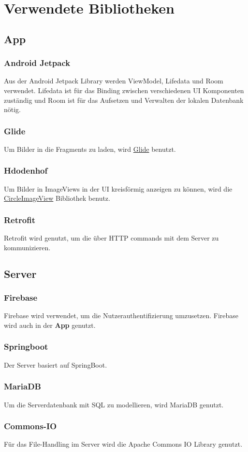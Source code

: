 \chapter{Verwendete Bibliotheken}

\section{App}

\subsection{Android Jetpack}
Aus der Android Jetpack Library werden ViewModel, Lifedata und Room verwendet. Lifedata ist für das Binding zwischen verschiedenen UI Komponenten zuständig und Room ist für das Aufsetzen und Verwalten der lokalen Datenbank nötig.

\subsection{Glide}
Um Bilder in die Fragments zu laden, wird \href{https://github.com/bumptech/glide}{Glide} benutzt.

\subsection{Hdodenhof}
Um Bilder in ImageViews in der UI kreisförmig anzeigen zu können, wird die \href{https://github.com/hdodenhof/CircleImageView}{CircleImageView} Bibliothek benutz.

\subsection{Retrofit}
Retrofit wird genutzt, um die über HTTP commands mit dem Server zu kommunizieren.


\section{Server}

\subsection{Firebase}
Firebase wird verwendet, um die Nutzerauthentifizierung umzusetzen. Firebase wird auch in der \textbf{App} genutzt.

\subsection{Springboot}
Der Server basiert auf SpringBoot.

\subsection{MariaDB}
Um die Serverdatenbank mit SQL zu modellieren, wird MariaDB genutzt.

\subsection{Commons-IO}
Für das File-Handling im Server wird die Apache Commons IO Library genutzt.
